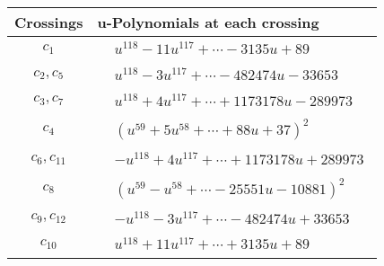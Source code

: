 \documentclass[1p]{elsarticle_modified}
\theoremstyle{definition}
\begin{document}
\begin{tabular}{m{50pt}|m{274pt}}
Crossings & \hspace{64pt}u-Polynomials at each crossing \\
\hline $$\begin{aligned}c_{1}\end{aligned}$$&$\begin{aligned}
&u^{118}-11 u^{117}+\cdots-3135 u+89
\end{aligned}$\\
\hline $$\begin{aligned}c_{2},c_{5}\end{aligned}$$&$\begin{aligned}
&u^{118}-3 u^{117}+\cdots-482474 u-33653
\end{aligned}$\\
\hline $$\begin{aligned}c_{3},c_{7}\end{aligned}$$&$\begin{aligned}
&u^{118}+4 u^{117}+\cdots+1173178 u-289973
\end{aligned}$\\
\hline $$\begin{aligned}c_{4}\end{aligned}$$&$\begin{aligned}
&(u^{59}+5 u^{58}+\cdots+88 u+37)^{2}
\end{aligned}$\\
\hline $$\begin{aligned}c_{6},c_{11}\end{aligned}$$&$\begin{aligned}
&- u^{118}+4 u^{117}+\cdots+1173178 u+289973
\end{aligned}$\\
\hline $$\begin{aligned}c_{8}\end{aligned}$$&$\begin{aligned}
&(u^{59}- u^{58}+\cdots-25551 u-10881)^{2}
\end{aligned}$\\
\hline $$\begin{aligned}c_{9},c_{12}\end{aligned}$$&$\begin{aligned}
&- u^{118}-3 u^{117}+\cdots-482474 u+33653
\end{aligned}$\\
\hline $$\begin{aligned}c_{10}\end{aligned}$$&$\begin{aligned}
&u^{118}+11 u^{117}+\cdots+3135 u+89
\end{aligned}$\\
\hline
\end{tabular}\\~\\
\end{document}
